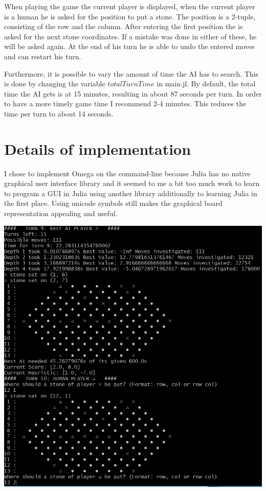 \documentclass[a4paper]{article}
\begin{document}
When playing the game the current player is displayed, when the current player is a human he is asked for the position to put a stone. The position is a 2-tuple, consisting of the row and the column. After entering the first position the is asked for the next stone coordinates. If a mistake was done in either of these, he will be asked again. At the end of his turn he is able to undo the entered moves and can restart his turn.

Furthermore, it is possible to vary the amount of time the AI has to search. This is done by changing the variable $totalTurnTime$ in main.jl. By default, the total time the AI gets is at 15 minutes, resulting in about 87 seconds per turn. In order to have a more timely game time I recommend 2-4 minutes. This reduces the time per turn to about 14 seconds.

\section{Details of implementation}
I chose to implement Omega on the command-line because Julia has no native graphical user interface library and it seemed to me a bit too much work to learn to program a GUI in Julia using another library additionally to learning Julia in the first place. Using unicode symbols still makes the graphical board representation appealing and useful.

\includegraphics[scale=0.5]{"Sample interface"}
\end{document}
